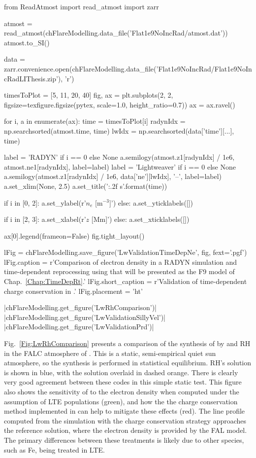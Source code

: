 \begin{pycode}[FlareModelling]
from ReadAtmost import read_atmost
import zarr

atmost = read_atmost(chFlareModelling.data_file('Flat1e9NoIncRad/atmost.dat'))
atmost.to_SI()

data = zarr.convenience.open(chFlareModelling.data_file('Flat1e9NoIncRad/Flat1e9NoIncRadLIThesis.zip'), 'r')

timesToPlot = [5, 11, 20, 40]
fig, ax = plt.subplots(2, 2, figsize=texfigure.figsize(pytex, scale=1.0, height_ratio=0.7))
ax = ax.ravel()

for i, a in enumerate(ax):
    time = timesToPlot[i]
    radynIdx = np.searchsorted(atmost.time, time)
    lwIdx = np.searchsorted(data['time'][...], time)

    label = 'RADYN' if i == 0 else None
    a.semilogy(atmost.z1[radynIdx] / 1e6, atmost.ne1[radynIdx], label=label)
    label = 'Lightweaver' if i == 0 else None
    a.semilogy(atmost.z1[radynIdx] / 1e6, data['ne'][lwIdx], '--', label=label)
    a.set_xlim(None, 2.5)
    a.set_title('{:.2f} s'.format(time))

    if i in [0, 2]:
        a.set_ylabel(r'$n_e$ [m$^{-3}$]')
    else:
        a.set_yticklabels([])

    if i in [2, 3]:
        a.set_xlabel(r'$z$ [Mm]')
    else:
        a.set_xticklabels([])

ax[0].legend(frameon=False)
fig.tight_layout()

lFig = chFlareModelling.save_figure('LwValidationTimeDepNe', fig, fext='.pgf')
lFig.caption = r'Comparison of electron density in a RADYN simulation and time-dependent reprocessing using \Lw{} that will be presented as the F9 model of Chap.~\ref{Chap:TimeDepRt}.'
lFig.short_caption = r'Validation of time-dependent charge conservation in \Lw{}.'
lFig.placement = 'ht'
\end{pycode}

\py[FlareModelling]|chFlareModelling.get_figure('LwRhComparison')|
\py[FlareModelling]|chFlareModelling.get_figure('LwValidationSillyVel')|
\py[FlareModelling]|chFlareModelling.get_figure('LwValidationPrd')|


Fig.~\ref{Fig:LwRhComparison} presents a comparison of the synthesis of \CaLine{} by \Lw{} and RH in the FALC atmosphere of \citet{Fontenla1993}.
This is a static, semi-empirical quiet sun atmosphere, so the synthesis is performed in statistical equilibrium.
RH's solution is shown in blue, with the \Lw{} solution overlaid in dashed orange.
There is clearly very good agreement between these codes in this simple static test.
This figure also shows the sensitivity of \CaLine{} to the electron density when computed under the assumption of LTE populations (green), and how the the charge conservation method implemented in \Lw{} can help to mitigate these effects (red).
The line profile computed from the simulation with the charge conservation strategy approaches the reference solution, where the electron density is provided by the FAL model.
The primary differences between these treatments is likely due to other species, such as Fe, being treated in LTE.


